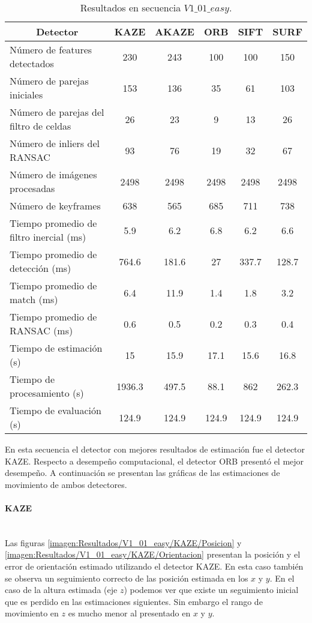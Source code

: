 \begin{table}[H]
	\caption{Resultados en secuencia $V1\_ 01\_ easy$.}
	\begin{tabular}{|l|c|c|c|c|c|}
		\hline
		\multicolumn{1}{|c|}{\textbf{Detector}} & \textbf{KAZE} & \textbf{AKAZE} & \textbf{ORB} & \textbf{SIFT} & \textbf{SURF} \\ \hline
		Número de features detectados & 230 & 243 & 100 & 100 & 150 \\ \hline
		Número de parejas iniciales & 153 & 136 & 35 & 61 & 103 \\ \hline
		Número de parejas del filtro de celdas & 26 & 23 & 9 & 13 & 26 \\ \hline
		Número de inliers del RANSAC & 93 & 76 & 19 & 32 & 67 \\ \hline
		Número de imágenes procesadas & 2498 & 2498 & 2498 & 2498 & 2498 \\ \hline
		Número de keyframes & 638 & 565 & 685 & 711 & 738 \\ \hline
		Tiempo promedio de filtro inercial (ms) & 5.9 & 6.2 & 6.8 & 6.2 & 6.6 \\ \hline
		Tiempo promedio de detección  (ms) & 764.6 & 181.6 & 27 & 337.7 & 128.7 \\ \hline
		Tiempo promedio de match (ms) & 6.4 & 11.9 & 1.4 & 1.8 & 3.2 \\ \hline
		Tiempo promedio de RANSAC (ms) & 0.6 & 0.5 & 0.2 & 0.3 & 0.4 \\ \hline
		Tiempo de estimación (s) & 15 & 15.9 & 17.1 & 15.6 & 16.8 \\ \hline
		Tiempo de  procesamiento (s) & 1936.3 & 497.5 & 88.1 & 862 & 262.3 \\ \hline
		Tiempo de evaluación (s) & 124.9 & 124.9 & 124.9 & 124.9 & 124.9 \\ \hline
	\end{tabular}
	\label{Tabla/Resultados/V1_01_easy}
\end{table}


En esta secuencia el detector con mejores resultados de estimación fue el detector KAZE. Respecto a desempeño computacional, el detector ORB presentó  el mejor desempeño. A continuación se presentan las gráficas de las estimaciones de movimiento de ambos detectores.
\paragraph {KAZE \\ \\}

Las figuras \ref{imagen:Resultados/V1_01_easy/KAZE/Posicion}  y \ref{imagen:Resultados/V1_01_easy/KAZE/Orientacion} presentan la posición y el error de orientación estimado utilizando el detector KAZE. En esta caso también se observa un seguimiento correcto de las posición estimada en los $x$ y $y$. En el caso de la altura estimada (eje $z$) podemos ver que existe un seguimiento inicial que es perdido en las estimaciones siguientes. Sin embargo el rango de movimiento en $z$ es mucho menor al presentado en $x$ y $y$.

